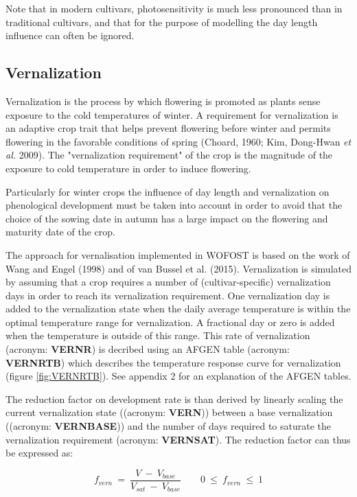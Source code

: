 Note that in modern cultivars, photosensitivity is much less pronounced than in traditional
cultivars, and that for the purpose of modelling the day length influence can often be ignored.


\subsection{Vernalization}

Vernalization is the process by which flowering is promoted as plants sense exposure to the cold temperatures 
of winter. A requirement for vernalization is an adaptive crop trait that helps prevent flowering before winter and
permits flowering in the favorable conditions of spring (Choard, 1960; Kim, Dong-Hwan {\it et al.} 2009).
The "vernalization requirement" of the crop is the magnitude of the exposure to cold temperature in order
to induce flowering.

Particularly for winter crops the influence of day length and vernalization on phenological development must 
be taken into account in order to avoid that the choice of the sowing date in autumn has a large impact on 
the flowering and maturity date of the crop.

The approach for vernalisation implemented in WOFOST is based on the work of Wang and Engel (1998) and of 
van Bussel et al. (2015). 
Vernalization is simulated by assuming that a crop requires a number of (cultivar-specific)
vernalization days in order to reach its vernalization requirement. One vernalization day is added to the 
vernalization state 
when the daily average temperature is within the optimal temperature range for vernalization. A fractional
day or zero  is added when the temperature is outside of this range. This rate of vernalization
(acronym: {\bf VERNR}) is decribed using an AFGEN table (acronym:  {\bf VERNRTB}) which describes the
temperature response curve for vernalization (figure \ref{fig:VERNRTB}). See appendix 2 for an explanation
of the AFGEN tables.

The reduction factor on development rate is than derived by linearly scaling the current vernalization state 
((acronym:  {\bf VERN}))  between a base vernalization ((acronym:  {\bf VERNBASE})) and the number of 
days required to saturate the vernalization requirement (acronym:  {\bf VERNSAT}). The reduction 
factor can thus be expressed as: 

\begin{equation}
\label{eq:vern_factor}
f_{vern} ~=~{\frac{V ~-~V_{base} }{V _{sat} ~-~ V_{base} }} ~~~~~~~~~0~\le ~f _{vern} ~\le ~1
\end{equation}

